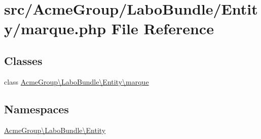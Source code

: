 \hypertarget{marque_8php}{\section{src/\+Acme\+Group/\+Labo\+Bundle/\+Entity/marque.php File Reference}
\label{marque_8php}
}
\subsection*{Classes}
\begin{DoxyCompactItemize}
\item 
class \hyperlink{class_acme_group_1_1_labo_bundle_1_1_entity_1_1marque}{Acme\+Group\textbackslash{}\+Labo\+Bundle\textbackslash{}\+Entity\textbackslash{}marque}
\end{DoxyCompactItemize}
\subsection*{Namespaces}
\begin{DoxyCompactItemize}
\item 
 \hyperlink{namespace_acme_group_1_1_labo_bundle_1_1_entity}{Acme\+Group\textbackslash{}\+Labo\+Bundle\textbackslash{}\+Entity}
\end{DoxyCompactItemize}
